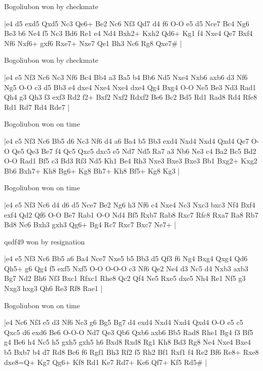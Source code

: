 \showboard

Bogoliubon won by checkmate

\makegametitle
|e4 d5 exd5 Qxd5 Nc3 Qe6+ Be2 Nc6 Nf3 Qd7 d4 f6 O-O e5 d5 Nce7 Bc4 Ng6 Be3 b6 Ne4 f5 Nc3 Bd6 Re1 e4 Nd4 Bxh2+ Kxh2 Qd6+ Kg1 f4 Nxe4 Qe7 Bxf4 Nf6 Nxf6+ gxf6 Rxe7+ Nxe7 Qe1 Bh3 Nc6 Rg8 Qxe7\#  |

\showboard

Bogoliubon won by checkmate

\makegametitle
|e4 e5 Nf3 Nc6 Nc3 Nf6 Bc4 Bb4 a3 Ba5 b4 Bb6 Nd5 Nxe4 Nxb6 axb6 d3 Nf6 Ng5 O-O c3 d5 Bb3 e4 dxe4 Nxe4 Nxe4 dxe4 Qg4 Bxg4 O-O Ne5 Be3 Nd3 Rad1 Qh4 g3 Qh3 f3 exf3 Rd2 f2+ Bxf2 Nxf2 Rdxf2 Be6 Bc2 Bd5 Rd1 Rad8 Rd4 Rfe8 Rd1 Rd7 Rd4 Rde7  |

\showboard

Bogoliubon won on time

\makegametitle
|e4 e5 Nf3 Nc6 Bb5 d6 Nc3 Nf6 d4 a6 Ba4 b5 Bb3 exd4 Nxd4 Nxd4 Qxd4 Qe7 O-O Qe5 Qe3 Be7 f4 Qc5 Qxc5 dxc5 e5 Nd7 Nd5 Ra7 a3 Nb6 Ne3 c4 Ba2 Bc5 Bd2 O-O Rad1 Bf5 c3 Bd3 Rf3 Nd5 Kh1 Be4 Rh3 Nxe3 Bxe3 Bxe3 Bb1 Bxg2+ Kxg2 Bb6 Bxh7+ Kh8 Bg6+ Kg8 Bh7+ Kh8 Bf5+ Kg8 Kg3  |

\showboard

Bogoliubon won on time

\makegametitle
|e4 e5 Nf3 Nc6 d4 d6 d5 Nce7 Be2 Ng6 h3 Nf6 c4 Nxe4 Nc3 Nxc3 bxc3 Nf4 Bxf4 exf4 Qd2 Qf6 O-O Be7 Rab1 O-O Nd4 Bf5 Rxb7 Rab8 Rxc7 Rfc8 Rxa7 Ra8 Rb7 Bd8 Nc6 Bxh3 gxh3 Qg6+ Bg4 Rc7 Rxc7 Bxc7 Ne7+  |

\showboard

qsdf49 won by resignation

\makegametitle
|e4 e5 Nf3 Nc6 Bb5 a6 Ba4 Nce7 Nxe5 b5 Bb3 d5 Qf3 f6 Ng4 Bxg4 Qxg4 Qd6 Qh5+ g6 Qg4 f5 exf5 Nxf5 O-O O-O-O c3 Nf6 Qe2 Ne4 d3 Nc5 d4 Nxb3 axb3 Bg7 Nd2 Bh6 Nf3 Bxc1 Rfxc1 Rhe8 Qc2 Qf4 Ne5 Rxe5 dxe5 Nh4 Re1 Nf5 g3 Nxg3 hxg3 Qh6 Re3 Rf8 Rae1  |

\showboard

Bogoliubon won on time

\makegametitle
|e4 Nc6 Nf3 e5 d3 Nf6 Nc3 g6 Bg5 Bg7 d4 exd4 Nxd4 Nxd4 Qxd4 O-O e5 c5 Qxc5 d6 exd6 Be6 O-O-O Nd7 Qe3 Qb6 Qxb6 axb6 Bb5 Rad8 Rhe1 Bg4 f3 Bf5 g4 Be6 h4 Nc5 h5 gxh5 gxh5 h6 Bxd8 Rxd8 Rg1 Kh8 Bd3 Rg8 Ne4 Nxe4 Bxe4 b5 Bxb7 b4 d7 Rd8 Bc6 f6 Rgf1 Bh3 Rf2 f5 Rh2 Bf1 Rxf1 f4 Re2 Bf6 Re8+ Rxe8 dxe8=Q+ Kg7 Qg6+ Kf8 Rd1 Ke7 Rd7+ Ke6 Qf7+ Kf5 Rd5\#  |

